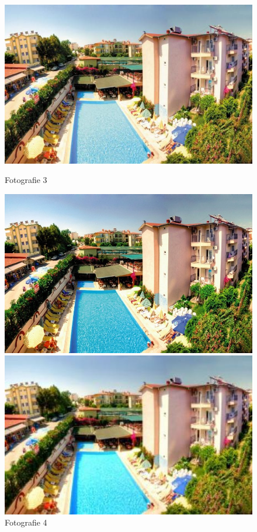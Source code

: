 \begin{figure}[!htb]
	\includegraphics[width=\linewidth]{graphics/kop/aa03.png}
	\caption{Fotografie 3}\label{fig:img03}
	\endminipage\hfill
	\includegraphics[width=\linewidth]{graphics/kop/aa04.png}
	\caption{Fotografie 4}\label{fig:img04}
	\endminipage\hfill
	\includegraphics[width=\linewidth]{graphics/kop/aa05.png}

\end{figure}
